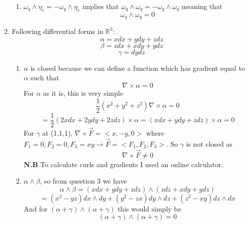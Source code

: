 \documentclass[12pt]{article}
\begin{document}
\begin{enumerate}
\begin{enumerate}
   \item $\omega_q \wedge \eta_r = - \omega_q \wedge \eta_r$ implies that $\omega_q \wedge \omega_q = - \omega_q \wedge \omega_q$ meaning that 
   $$ \omega_q \wedge \omega_q = 0 $$

 \end{enumerate}

 \item Following differential forms in $\mathbb{R}^3$: 
 $$ \alpha = x dx + ydy + zdz $$
$$ \beta = z dx + x dy + y dz $$
$$ \gamma = dy dz $$
\begin{enumerate}
  \item $\alpha$ is closed because we can define a function which has gradient equal to $\alpha$ such that 
  $$ \nabla \times \alpha = 0 $$
  For $\alpha$ as it is, this is very simple 
  $$ \frac{1}{2} ( x^2 + y^2 + z^2) \nabla \times \alpha = 0 $$
  $$ = \frac{1}{2} ( 2x dx + 2y dy + 2z dz ) \times \alpha = (xdx + ydy + z dz ) \times \alpha = 0 $$
  For $\gamma$ at (1,1,1), $\nabla \times \vec{F} = <x,-y, 0 >$ where $F_1 =0, F_2 =0, F_3 = xy \rightarrow \vec{F} = <F_1, F_2, F_3 > $. So $\gamma$ is not closed as 
  $$ \nabla \times \vec{F} \neq 0 $$
  \textbf{N.B} To calculate curls and gradients I used an online calculator. 

  \item $\alpha \wedge \beta$, so from question 3 we have 
  $$ \alpha \wedge \beta = (x dx + ydy + zdz) \wedge (zdz + x dy + y dz) $$
  $$ = (x^2 - yz) dx \wedge dy + (y^2 - zx) dy \wedge dz + (z^2 - xy) dz \wedge dx $$
  And for $(\alpha + \gamma) \wedge ( \alpha + \gamma)$ this would simply be 
  $$ (\alpha + \gamma) \wedge ( \alpha + \gamma) = 0 $$
\end{enumerate}


\end{enumerate}
\end{document}
